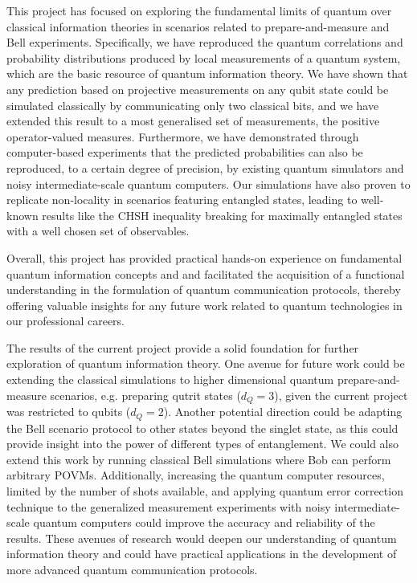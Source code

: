 This project has focused on exploring the fundamental limits of quantum over classical information theories in scenarios related to prepare-and-measure and Bell experiments. Specifically, we have reproduced the quantum correlations and probability distributions produced by local measurements of a quantum system, which are the basic resource of quantum information theory. We have shown that any prediction based on projective measurements on any qubit state could be simulated classically by communicating only two classical bits, and we have extended this result to a most generalised set of measurements, the positive operator-valued measures. Furthermore, we have demonstrated through computer-based experiments that the predicted probabilities can also be reproduced, to a certain degree of precision, by existing quantum simulators and noisy intermediate-scale quantum computers. Our simulations have also proven to replicate non-locality in scenarios featuring entangled states, leading to well-known results like the CHSH inequality breaking for maximally entangled states with a well chosen set of observables. 

Overall, this project has provided practical hands-on experience on fundamental quantum information concepts and and facilitated the acquisition of a functional understanding in the formulation of quantum communication protocols, thereby offering valuable insights for any future work related to quantum technologies in our professional careers.


The results of the current project provide a solid foundation for further exploration of quantum information theory. One avenue for future work could be extending the classical simulations to higher dimensional quantum prepare-and-measure scenarios, e.g. preparing qutrit states ($d_Q = 3$), given the current project was restricted to qubits ($d_Q = 2$). Another potential direction could be adapting the Bell scenario protocol to other states beyond the singlet state, as this could provide insight into the power of different types of entanglement. We could also extend this work by running classical Bell simulations where Bob can perform arbitrary POVMs. Additionally, increasing the quantum computer resources, limited by the number of shots available, and applying quantum error correction technique to the generalized measurement experiments with noisy intermediate-scale quantum computers could improve the accuracy and reliability of the results. These avenues of research would deepen our understanding of quantum information theory and could have practical applications in the development of more advanced quantum communication protocols.
